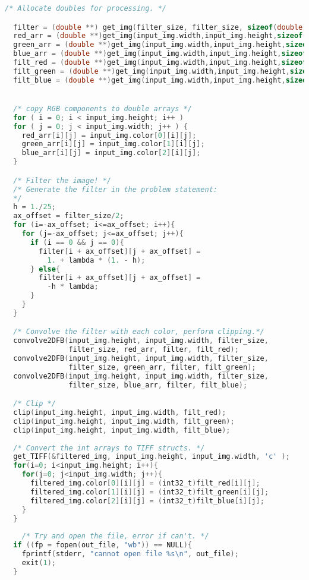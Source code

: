 \documentclass{article}
\begin{document}
\begin{lstlisting}[language=C, caption=filter\_image\_section4.c, label={lst:sec4}]
  /* Allocate doubles for processing. */

  filter = (double **) get_img(filter_size, filter_size, sizeof(double));
  red_arr = (double **)get_img(input_img.width,input_img.height,sizeof(double));
  green_arr = (double **)get_img(input_img.width,input_img.height,sizeof(double));
  blue_arr = (double **)get_img(input_img.width,input_img.height,sizeof(double));
  filt_red = (double **)get_img(input_img.width,input_img.height,sizeof(double));
  filt_green = (double **)get_img(input_img.width,input_img.height,sizeof(double));
  filt_blue = (double **)get_img(input_img.width,input_img.height,sizeof(double));


  /* copy RGB components to double arrays */
  for ( i = 0; i < input_img.height; i++ )
  for ( j = 0; j < input_img.width; j++ ) {
    red_arr[i][j] = input_img.color[0][i][j];
    green_arr[i][j] = input_img.color[1][i][j];
    blue_arr[i][j] = input_img.color[2][i][j];
  }

  /* Filter the image! */
  /* Generate the filter in the problem statement:
  */
  h = 1./25;
  ax_offset = filter_size/2;
  for (i=-ax_offset; i<=ax_offset; i++){
    for (j=-ax_offset; j<=ax_offset; j++){
      if (i == 0 && j == 0){
        filter[i + ax_offset][j + ax_offset] = 
          1. + lambda * (1. - h);
      } else{
        filter[i + ax_offset][j + ax_offset] = 
          -h * lambda;
      }
    }
  }

  /* Convolve the filter with each color, perform clipping.*/
  convolve2DFB(input_img.height, input_img.width, filter_size,
               filter_size, red_arr, filter, filt_red);
  convolve2DFB(input_img.height, input_img.width, filter_size,
               filter_size, green_arr, filter, filt_green);
  convolve2DFB(input_img.height, input_img.width, filter_size,
               filter_size, blue_arr, filter, filt_blue);

  /* Clip */
  clip(input_img.height, input_img.width, filt_red);
  clip(input_img.height, input_img.width, filt_green);
  clip(input_img.height, input_img.width, filt_blue);
  
  /* Convert the int arrays to TIFF structs. */
  get_TIFF(&filtered_img, input_img.height, input_img.width, 'c' );
  for(i=0; i<input_img.height; i++){
    for(j=0; j<input_img.width; j++){
      filtered_img.color[0][i][j] = (int32_t)filt_red[i][j];
      filtered_img.color[1][i][j] = (int32_t)filt_green[i][j];
      filtered_img.color[2][i][j] = (int32_t)filt_blue[i][j];
    }
  }
  
    /* Try and open the file, error if can't. */
  if ((fp = fopen(out_file, "wb")) == NULL){
    fprintf(stderr, "cannot open file %s\n", out_file);
    exit(1);
  }


\end{lstlisting}
\end{document}
